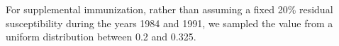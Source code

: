 For supplemental immunization, rather than assuming a fixed 20\% residual susceptibility during the years 1984 and 1991, we sampled the value from a uniform distribution between 0.2 and 0.325.